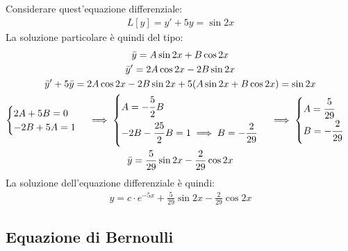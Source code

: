 \documentclass{article}
\numberwithin{equation}{subsection}
\begin{document}
Considerare quest'equazione differenziale:
\begin{gather*}
    L[y]=y'+5y=\sin2x
\end{gather*}
La soluzione particolare è quindi del tipo:
\begin{gather*}
    \bar{y}=A\sin2x+B\cos2x\\
    \bar{y}'=2A\cos2x-2B\sin2x\\
    \bar{y}'+5\bar{y}=2A\cos2x-2B\sin2x+5(A\sin2x+B\cos2x)=\sin2x\\
    \begin{cases}
        2A+5B=0\\
        -2B+5A=1
    \end{cases}\implies\begin{cases}
        A=\displaystyle-\frac{\strut5}{\strut2}B\\
        -2B-\displaystyle\frac{\strut25}{\strut2}B=1\implies B=\displaystyle-\frac{2}{29}
    \end{cases}\implies\begin{cases}
        A=\displaystyle\frac{\strut5}{29}\\
        B=\displaystyle-\frac{\strut2}{\strut29}
    \end{cases}\\
    \bar{y}=\displaystyle\frac{5}{29}\sin2x-\frac{2}{29}\cos2x
\end{gather*}
La soluzione dell'equazione differenziale è quindi:
\begin{gather*}
    y=c\cdot e^{-5x}+\displaystyle\frac{5}{29}\sin2x-\frac{2}{29}\cos2x
\end{gather*}

\subsection{Equazione di Bernoulli}
\end{document}
